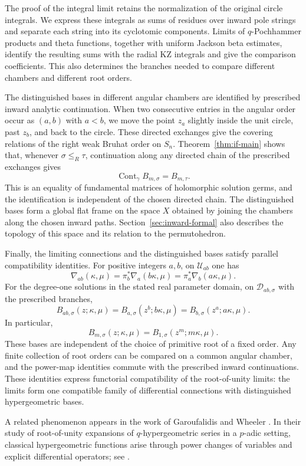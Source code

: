 \documentclass[12pt]{amsart}
\theoremstyle{definition}
\numberwithin{equation}{section}
\theoremstyle{definition}
\let\mc\mathcal
\let\gm\gamma
\let\ka\kappa
\let\si\sigma
\let\le\leqslant
\begin{document}
The proof of the integral limit retains the normalization of
the original circle integrals. We express these integrals as
sums of residues over inward pole strings and separate each
string into its cyclotomic components. Limits of
$q$-Pochhammer products and theta functions, together with
uniform Jackson beta estimates, identify the resulting sums
with the radial KZ integrals and give the comparison
coefficients. This also determines the branches needed to
compare different chambers and different root orders.

The distinguished bases in different angular chambers are
identified by prescribed inward analytic continuation. When two
consecutive entries in the angular order occur as $(a,b)$ with
$a<b$, we move the point $z_a$ slightly inside the unit circle,
past $z_b$, and back to the circle. These directed exchanges
give the covering relations of the right weak Bruhat order on
$S_n$. Theorem~\ref{thm:if-main} shows that, whenever
$\si\le_R\tau$, continuation along any directed chain of
the prescribed exchanges gives
\[
 \operatorname{Cont}_{\gm}B_{m,\si}=B_{m,\tau}.
\]
This is an equality of fundamental matrices of holomorphic
solution germs, and the identification is independent of the
chosen directed chain. The distinguished bases form a global
flat frame on the space $X$ obtained by joining the chambers
along the chosen inward paths. Section~\ref{sec:inward-formal}
also describes the topology of this space and its relation to
the permutohedron.

Finally, the limiting connections and the distinguished bases
satisfy parallel compatibility identities. For positive
integers $a,b$, on $\mc U_{ab}$ one has
\[
 \nabla_{ab}(\ka,\mu)
 =\pi_b^*\nabla_a(b\ka,\mu)
 =\pi_a^*\nabla_b(a\ka,\mu).
\]
For the degree-one solutions in the stated real parameter
domain, on $\mc D_{ab,\si}$ with the prescribed branches,
\[
 B_{ab,\si}(z;\ka,\mu)
 =B_{a,\si}(z^b;b\ka,\mu)
 =B_{b,\si}(z^a;a\ka,\mu).
\]
In particular,
\[
 B_{m,\si}(z;\ka,\mu)
 =B_{1,\si}(z^m;m\ka,\mu).
\]
These bases are independent of the choice of primitive root
of a fixed order. Any finite collection of root orders can be
compared on a common angular chamber, and the power-map
identities commute with the prescribed inward continuations.
These identities express functorial compatibility of the
root-of-unity limits: the limits form one compatible family of
differential connections with distinguished hypergeometric
bases.

A related phenomenon appears in the work of Garoufalidis and
Wheeler \cite{GW25}. In their study of root-of-unity expansions of
$q$-hypergeometric series in a $p$-adic setting, classical
hypergeometric functions arise through power changes of variables
and explicit differential operators; see
\cite[Section~1.4, (22)--(23)]{GW25}.
\end{document}
